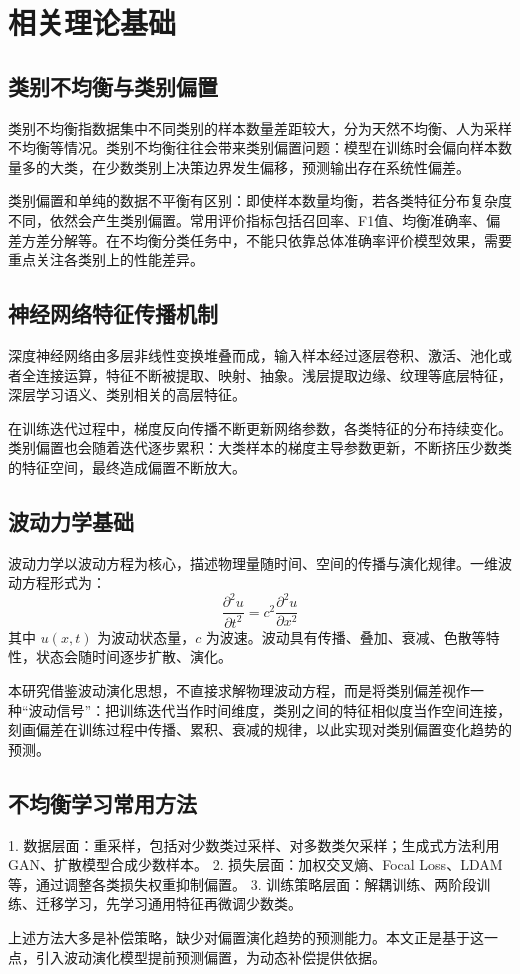 \section{相关理论基础}
\subsection{类别不均衡与类别偏置}
类别不均衡指数据集中不同类别的样本数量差距较大，分为天然不均衡、人为采样不均衡等情况。类别不均衡往往会带来类别偏置问题：模型在训练时会偏向样本数量多的大类，在少数类别上决策边界发生偏移，预测输出存在系统性偏差。

类别偏置和单纯的数据不平衡有区别：即使样本数量均衡，若各类特征分布复杂度不同，依然会产生类别偏置。常用评价指标包括召回率、F1值、均衡准确率、偏差方差分解等。在不均衡分类任务中，不能只依靠总体准确率评价模型效果，需要重点关注各类别上的性能差异。

\subsection{神经网络特征传播机制}
深度神经网络由多层非线性变换堆叠而成，输入样本经过逐层卷积、激活、池化或者全连接运算，特征不断被提取、映射、抽象。浅层提取边缘、纹理等底层特征，深层学习语义、类别相关的高层特征。

在训练迭代过程中，梯度反向传播不断更新网络参数，各类特征的分布持续变化。类别偏置也会随着迭代逐步累积：大类样本的梯度主导参数更新，不断挤压少数类的特征空间，最终造成偏置不断放大。

\subsection{波动力学基础}
波动力学以波动方程为核心，描述物理量随时间、空间的传播与演化规律。一维波动方程形式为：
\[
\frac{\partial^2 u}{\partial t^2}=c^2\frac{\partial^2 u}{\partial x^2}
\]
其中 $u(x,t)$ 为波动状态量，$c$ 为波速。波动具有传播、叠加、衰减、色散等特性，状态会随时间逐步扩散、演化。

本研究借鉴波动演化思想，不直接求解物理波动方程，而是将类别偏差视作一种“波动信号”：把训练迭代当作时间维度，类别之间的特征相似度当作空间连接，刻画偏差在训练过程中传播、累积、衰减的规律，以此实现对类别偏置变化趋势的预测。

\subsection{不均衡学习常用方法}
1. 数据层面：重采样，包括对少数类过采样、对多数类欠采样；生成式方法利用GAN、扩散模型合成少数样本。
2. 损失层面：加权交叉熵、Focal Loss、LDAM等，通过调整各类损失权重抑制偏置。
3. 训练策略层面：解耦训练、两阶段训练、迁移学习，先学习通用特征再微调少数类。

上述方法大多是补偿策略，缺少对偏置演化趋势的预测能力。本文正是基于这一点，引入波动演化模型提前预测偏置，为动态补偿提供依据。

